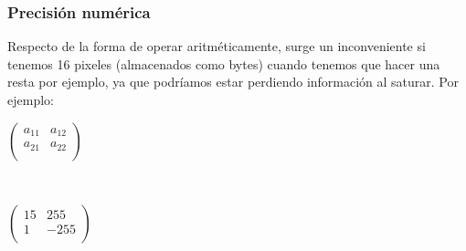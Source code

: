 % 
% 
% 

\subsubsection{Precisión numérica} %

Respecto de la forma de operar aritméticamente, surge un inconveniente si tenemos 16 pixeles (almacenados como bytes) cuando tenemos que hacer una resta por ejemplo, ya que podríamos estar perdiendo información al saturar. Por ejemplo:

\begin{center}
\begin{minipage}{0.30 \textwidth}
$\begin{pmatrix}
a_{11} & a_{12} \\
a_{21} & a_{22}  \\
\end{pmatrix}$
\end{minipage}
\ \ 
 \begin{minipage}{0.30 \textwidth}
$\begin{pmatrix}
15 & 255 \\
1 & -255 \\
\end{pmatrix}$
\end{minipage}
\end{center}


